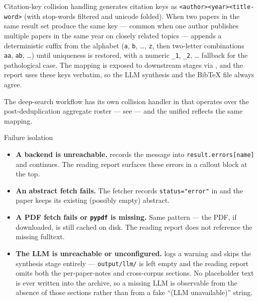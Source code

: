 \documentclass[
  ignorenonframetext,
]{beamer}
\providecommand{\tightlist}{%
  \setlength{\itemsep}{0pt}\setlength{\parskip}{0pt}}
\begin{document}
\begin{frame}{Citation-key collision handling}
\protect{}\label{citation-key-collision-handling}
 generates citation keys as
\texttt{\textless{}author\textgreater{}\textless{}year\textgreater{}\textless{}title-word\textgreater{}}
(with stop-words filtered and unicode folded). When two papers in the
same result set produce the same key --- common when one author
publishes multiple papers in the same year on closely related topics ---
 appends a
deterministic suffix from the alphabet (\texttt{a}, \texttt{b}, \ldots,
\texttt{z}, then two-letter combinations \texttt{aa}, \texttt{ab},
\ldots) until uniqueness is restored, with a numeric \texttt{\_1},
\texttt{\_2}, \ldots{} fallback for the pathological case. The mapping
is exposed to downstream stages via
, and the report uses
these keys verbatim, so the LLM synthesis and the BibTeX file always
agree.

The deep-search workflow has its own collision handler in
 that operates over the
post-deduplication aggregate roster --- see  ---
and the unified  reflects the same mapping.
\end{frame}

\begin{frame}{Failure isolation}
\protect{}\label{failure-isolation}
\begin{itemize}
\tightlist
\item
  \textbf{A backend is unreachable.}  records
  the message into \texttt{result.errors{[}name{]}} and continues. The
  reading report surfaces these errors in a callout block at the top.
\item
  \textbf{An abstract fetch fails.} The fetcher records
  \texttt{status="error"} in  and the paper
  keeps its existing (possibly empty) abstract.
\item
  \textbf{A PDF fetch fails or \texttt{pypdf} is missing.} Same pattern
  --- the PDF, if downloaded, is still cached on disk. The reading
  report does not reference the missing fulltext.
\item
  \textbf{The LLM is unreachable or unconfigured.}
   logs a warning and skips the
  synthesis stage entirely --- \texttt{output/llm/} is left empty and
  the reading report omits both the per-paper-notes and cross-corpus
  sections. No placeholder text is ever written into the archive, so a
  missing LLM is observable from the absence of those sections rather
  than from a fake ``(LLM unavailable)'' string.
\end{itemize}
\end{frame}
\end{document}
